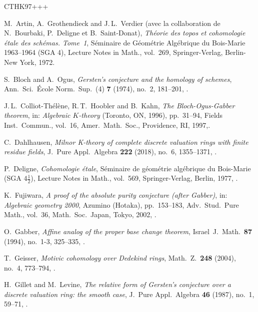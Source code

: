 \newcommand{\etalchar}[1]{$^{#1}$}

\begin{thebibliography}{CTHK97+++}

M.~Artin, A.~Grothendieck and J.\,L.~Verdier (avec la collaboration de N.~Bourbaki, P.~Deligne et B.~Saint-Donat), \emph{Th\'{e}orie des topos et cohomologie \'{e}tale des sch\'{e}mas. Tome~1}, S\'{e}minaire de G\'{e}om\'{e}trie Alg\'{e}brique du Bois-Marie 1963--1964 (SGA 4), Lecture Notes in Math., vol.~269, Springer-Verlag, Berlin-New York, 1972.

S.~Bloch and A.~Ogus, \emph{Gersten's conjecture and the homology of schemes},
Ann.\ Sci.\ \'Ecole Norm.\ Sup.\ (4) \textbf{7} (1974), no.~2, 181--201,
.

J.\,L.~Colliot-Th\'el\`ene, R.\,T.~Hoobler and B.~Kahn, \emph{The
  {B}loch-{O}gus-{G}abber theorem}, in: \emph{Algebraic {$K$}-theory} ({T}oronto, {ON}, 1996),  pp.~31--94, Fields Inst.\ Commun., vol.~16, Amer.\ Math.\ Soc., Providence, RI, 1997,.

C.~Dahlhausen, \emph{Milnor {K}-theory of complete discrete valuation rings
  with finite residue fields}, J.\ Pure Appl.\ Algebra \textbf{222} (2018),
  no.~6, 1355--1371, .

P.~Deligne, \emph{Cohomologie \'{e}tale}, S\'{e}minaire de g\'{e}om\'{e}trie
  alg\'{e}brique du Bois-Marie (SGA $4\frac{1}{2}$), Lecture Notes in Math., vol.~569, Springer-Verlag, Berlin, 1977, .
  
K.~Fujiwara, \emph{A proof of the absolute purity conjecture (after {G}abber)},
 in: \emph{Algebraic geometry 2000}, {A}zumino ({H}otaka), pp.~153--183, Adv.\ Stud.\ Pure Math.,  vol.~36, Math.\ Soc.\ Japan, Tokyo, 2002, .
 
O.~Gabber, \emph{Affine analog of the proper base change theorem}, Israel~J.\
  Math.\ \textbf{87} (1994), no.~1-3, 325--335,
  .

T.~Geisser, \emph{Motivic cohomology over {D}edekind rings}, Math.~Z.\
  \textbf{248} (2004), no.~4, 773--794, .

\bibitem[GL87]{GL87}
H.~Gillet and M.~Levine, \emph{The relative form of {G}ersten's conjecture over
  a discrete valuation ring: the smooth case}, J.~Pure Appl.\ Algebra
  \textbf{46} (1987), no.~1, 59--71, \doi{10.1016/0022-4049(87)90043-0}.


\end{thebibliography}
